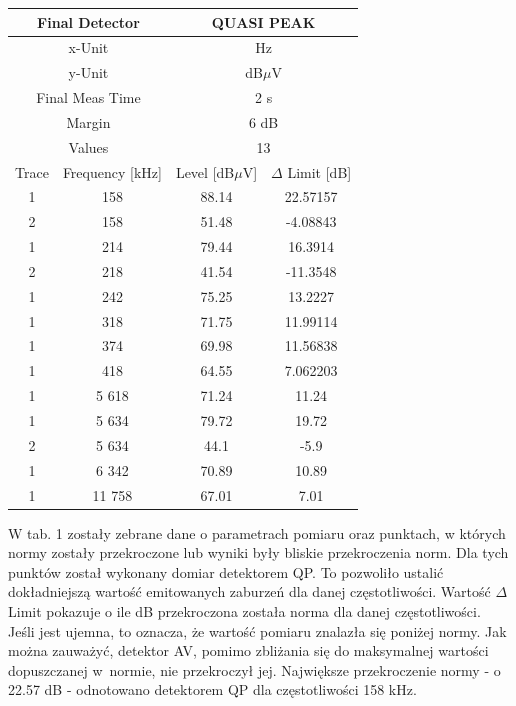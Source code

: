 \documentclass[12pt, a4paper, oneside]{article}
\begin{document}
\begin{table}[h!]
\begin{tabular}{|c|c|c|c|}
    \multicolumn{2}{|c|}{Final Detector} & \multicolumn{2}{|c|}{QUASI PEAK} \\\hline
    \multicolumn{2}{|c|}{x-Unit} & \multicolumn{2}{|c|}{Hz} \\\hline
    \multicolumn{2}{|c|}{y-Unit} & \multicolumn{2}{|c|}{dB$\mu$V} \\\hline
    \multicolumn{2}{|c|}{Final Meas Time} & \multicolumn{2}{|c|}{2 s} \\\hline
    \multicolumn{2}{|c|}{Margin} & \multicolumn{2}{|c|}{6 dB} \\\hline
    \multicolumn{2}{|c|}{Values} & \multicolumn{2}{|c|}{13} \\\hline
    Trace & Frequency [kHz] & Level [dB$\mu$V] & $\Delta$ Limit [dB] \\\hline
    1 & 158   & 88.14 & 22.57157 \\\hline
    2 & 158   & 51.48 & -4.08843 \\\hline
    1 & 214   & 79.44 & 16.3914 \\\hline
    2 & 218   & 41.54 & -11.3548 \\\hline
    1 & 242   & 75.25 & 13.2227 \\\hline
    1 & 318   & 71.75 & 11.99114 \\\hline
    1 & 374   & 69.98 & 11.56838 \\\hline
    1 & 418   & 64.55 & 7.062203 \\\hline
    1 & 5 618   & 71.24 & 11.24 \\\hline
    1 & 5 634   & 79.72 & 19.72 \\\hline
    2 & 5 634   & 44.1 & -5.9 \\\hline
    1 & 6 342   & 70.89 & 10.89 \\\hline
    1 & 11 758   & 67.01 & 7.01 \\\hline
    \end{tabular}%
  \label{tab:addlabel}%
\end{table}%
W tab. 1 zostały zebrane dane o parametrach pomiaru oraz punktach, w których normy zostały przekroczone lub wyniki były bliskie przekroczenia norm. Dla tych punktów został wykonany domiar detektorem QP. To pozwoliło ustalić dokładniejszą wartość emitowanych zaburzeń dla danej częstotliwości. Wartość $\Delta$ Limit pokazuje o ile dB przekroczona została norma dla danej częstotliwości. Jeśli jest ujemna, to oznacza, że wartość pomiaru znalazła się poniżej normy. Jak można zauważyć, detektor AV, pomimo zbliżania się do maksymalnej wartości dopuszczanej w~normie, nie przekroczył jej. Największe przekroczenie normy - o 22.57 dB - odnotowano detektorem QP dla częstotliwości 158 kHz.
\end{document}
